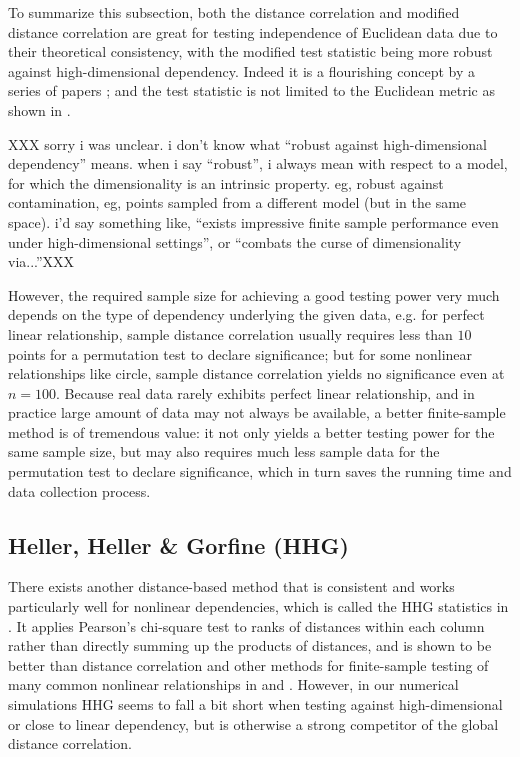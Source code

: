 \documentclass[11pt]{article}
\begin{document}
To summarize this subsection, both the distance correlation and modified distance correlation are great for testing independence of Euclidean data due to their theoretical consistency, with the modified test statistic being more robust against high-dimensional dependency. Indeed it is a flourishing concept by a series of papers \cite{BakirovRizzoSzekely2006, SzekelyRizzoBakirov2007, SzekelyRizzo2009, BickelXu2009, Kosorok2009, Remillard2009, LiZhongZhu2012, SzekelyRizzo2013a, SzekelyRizzo2013b, SzekelyRizzo2014}; and the test statistic is not limited to the Euclidean metric as shown in \cite{Lyons2013}. 

XXX sorry i was unclear.  i don't know what ``robust against high-dimensional dependency'' means. when i say ``robust'', i always mean with respect to a model, for which the dimensionality is an intrinsic property.  eg, robust against contamination, eg, points sampled from a different model (but in the same space). i'd say something like, ``exists impressive finite sample performance even under high-dimensional settings'', or ``combats the curse of dimensionality via...''XXX

However, the required sample size for achieving a good testing power very much depends on the type of dependency underlying the given data, e.g. for perfect linear relationship, sample distance correlation usually requires less than $10$ points for a permutation test to declare significance; but for some nonlinear relationships like circle, sample distance correlation yields no significance even at $n=100$. Because real data rarely exhibits perfect linear relationship, and in practice large amount of data may not always be available, a better finite-sample method is of tremendous value: it not only yields a better testing power for the same sample size, but may also requires much less sample data for the permutation test to declare significance, which in turn saves the running time and data collection process. 


\subsection{Heller, Heller \& Gorfine (HHG)}
\label{sec:hhg}


There exists another distance-based method that is consistent and works particularly well for nonlinear dependencies, which is called the HHG statistics in \cite{HellerGorfine2013}. It applies Pearson's chi-square test to ranks of distances within each column rather than directly summing up the products of distances, and is shown to be better than distance correlation and other methods for finite-sample testing of many common nonlinear relationships in \cite{GorfineHellerHeller2012} and \cite{HellerGorfine2013}. However, in our numerical simulations HHG seems to fall a bit short when testing against high-dimensional or close to linear dependency, but is otherwise a strong competitor of the global distance correlation. 
\end{document}
